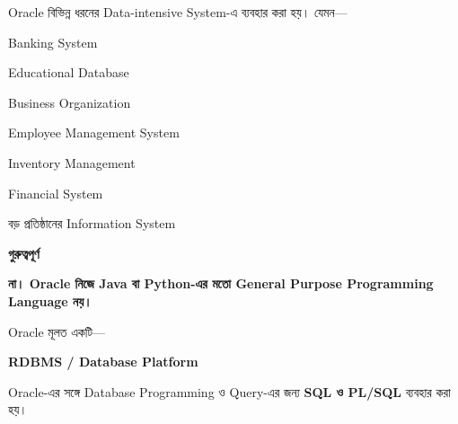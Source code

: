 
Oracle বিভিন্ন ধরনের Data-intensive System-এ ব্যবহার করা হয়।
যেমন—

\begin{compacttwocolpoints}

\item Banking System

\item Educational Database

\item Business Organization

\item Employee Management System

\item Inventory Management

\item Financial System

\item বড় প্রতিষ্ঠানের Information System

\end{compacttwocolpoints}


\begin{rememberbox}

\textbf{\color{deepOrange}গুরুত্বপূর্ণ}

\textbf{না। Oracle নিজে Java বা Python-এর মতো General Purpose
Programming Language নয়।}

Oracle মূলত একটি—

\begin{center}

\textbf{
RDBMS / Database Platform
}

\end{center}

Oracle-এর সঙ্গে Database Programming ও Query-এর জন্য
\textbf{SQL ও PL/SQL} ব্যবহার করা হয়।

\end{rememberbox}


